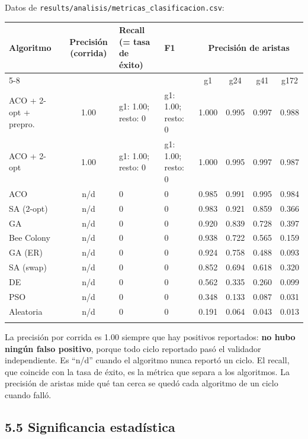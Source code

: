 \documentclass[
  spanish,
  11pt,
]{article}
\newcounter{none} %
\begin{document}
Datos de \texttt{results/analisis/metricas\_clasificacion.csv}:

{\def\LTcaptype{none} %
\footnotesize\setlength{\tabcolsep}{4pt}
\begin{center}
\begin{tabular}{@{}lcllcccc@{}}
\toprule\noalign{}
Algoritmo & Precisión (corrida) & Recall (= tasa de éxito) & F1 & \multicolumn{4}{c}{Precisión de aristas} \\
\cmidrule(l){5-8}
 & & & & g1 & g24 & g41 & g172 \\
\midrule\noalign{}
ACO + 2-opt + prepro. & 1.00 & g1: 1.00; resto: 0 & g1: 1.00; resto: 0 &
1.000 & 0.995 & 0.997 & 0.988 \\
ACO + 2-opt & 1.00 & g1: 1.00; resto: 0 & g1: 1.00; resto: 0 & 1.000 & 0.995 & 0.997 & 0.987 \\
ACO & n/d & 0 & 0 & 0.985 & 0.991 & 0.995 & 0.984 \\
SA (2-opt) & n/d & 0 & 0 & 0.983 & 0.921 & 0.859 & 0.366 \\
GA & n/d & 0 & 0 & 0.920 & 0.839 & 0.728 & 0.397 \\
Bee Colony & n/d & 0 & 0 & 0.938 & 0.722 & 0.565 & 0.159 \\
GA (ER) & n/d & 0 & 0 & 0.924 & 0.758 & 0.488 & 0.093 \\
SA (swap) & n/d & 0 & 0 & 0.852 & 0.694 & 0.618 & 0.320 \\
DE & n/d & 0 & 0 & 0.562 & 0.335 & 0.260 & 0.099 \\
PSO & n/d & 0 & 0 & 0.348 & 0.133 & 0.087 & 0.031 \\
Aleatoria & n/d & 0 & 0 & 0.191 & 0.064 & 0.043 & 0.013 \\
\bottomrule\noalign{}
\end{tabular}
\end{center}
}

La precisión por corrida es 1.00 siempre que hay positivos reportados:
\textbf{no hubo ningún falso positivo}, porque todo ciclo reportado pasó
el validador independiente. Es ``n/d'' cuando el algoritmo nunca reportó
un ciclo. El recall, que coincide con la tasa de éxito, es la métrica
que separa a los algoritmos. La precisión de aristas mide qué tan cerca
se quedó cada algoritmo de un ciclo cuando falló.

\subsection{5.5 Significancia
estadística}\label{significancia-estaduxedstica}
\end{document}
